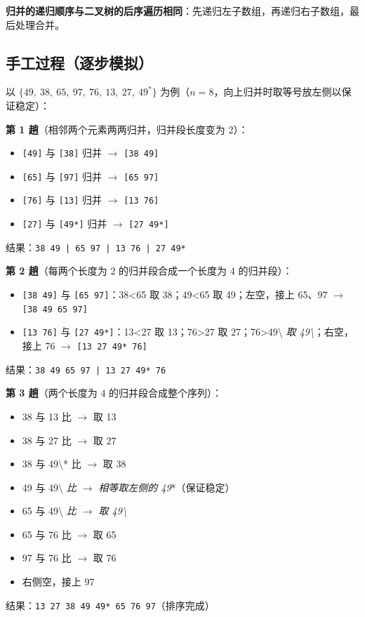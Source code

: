\documentclass[11pt,openany,UTF8]{ctexbook}
\begin{document}
\textbf{归并的递归顺序与二叉树的后序遍历相同}：先递归左子数组，再递归右子数组，最后处理合并。

\subsection{手工过程（逐步模拟）}

以 $\{49,\ 38,\ 65,\ 97,\ 76,\ 13,\ 27,\ 49^*\}$ 为例（$n=8$，向上归并时取等号放左侧以保证稳定）：

\textbf{第 1 趟}（相邻两个元素两两归并，归并段长度变为 2）：

\begin{itemize}
\item \texttt{[49]\allowbreak{}} 与 \texttt{[38]\allowbreak{}} 归并 $\to$ \texttt{[38 49]\allowbreak{}}
\item \texttt{[65]\allowbreak{}} 与 \texttt{[97]\allowbreak{}} 归并 $\to$ \texttt{[65 97]\allowbreak{}}
\item \texttt{[76]\allowbreak{}} 与 \texttt{[13]\allowbreak{}} 归并 $\to$ \texttt{[13 76]\allowbreak{}}
\item \texttt{[27]\allowbreak{}} 与 \texttt{[49*]\allowbreak{}} 归并 $\to$ \texttt{[27 49*]\allowbreak{}}
\end{itemize}
结果：\texttt{38 49 | 65 97 | 13 76 | 27 49*}

\textbf{第 2 趟}（每两个长度为 2 的归并段合成一个长度为 4 的归并段）：

\begin{itemize}
\item \texttt{[38 49]\allowbreak{}} 与 \texttt{[65 97]\allowbreak{}}：38<65 取 38；49<65 取 49；左空，接上 65、97 $\to$ \texttt{[38 49 65 97]\allowbreak{}}
\item \texttt{[13 76]\allowbreak{}} 与 \texttt{[27 49*]\allowbreak{}}：13<27 取 13；76>27 取 27；76>49\textbackslash{}\emph{ 取 49\textbackslash{}}；右空，接上 76 $\to$ \texttt{[13 27 49* 76]\allowbreak{}}
\end{itemize}
结果：\texttt{38 49 65 97 | 13 27 49* 76}

\textbf{第 3 趟}（两个长度为 4 的归并段合成整个序列）：

\begin{itemize}
\item 38 与 13 比 $\to$ 取 13
\item 38 与 27 比 $\to$ 取 27
\item 38 与 49\textbackslash{}* 比 $\to$ 取 38
\item 49 与 49\textbackslash{}\emph{ 比 $\to$ }\emph{相等取左侧的 49}*（保证稳定）
\item 65 与 49\textbackslash{}\emph{ 比 $\to$ 取 49\textbackslash{}}
\item 65 与 76 比 $\to$ 取 65
\item 97 与 76 比 $\to$ 取 76
\item 右侧空，接上 97
\end{itemize}
结果：\texttt{13 27 38 49 49* 65 76 97}（排序完成）
\end{document}
